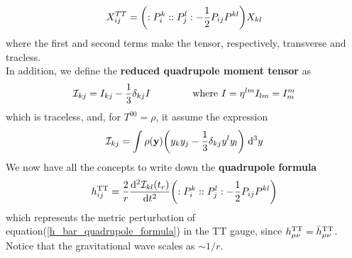 \begin{equation}
\label{TT_projection}
X^{TT} _{ij} = \qty(:P_{i}^{k}::P_{j}^{l}: - \dfrac{1}{2} P_{ij} P^{kl}) X_{kl}
\end{equation}
where the first and second terms make the tensor, respectively, transverse and tracless.\\
In addition, we define the \textbf{reduced quadrupole moment tensor} as
\begin{equation}
\label{reduced_quadrupole_moment_tensor}
\mathcal{I}_{kj} = I_{kj} - \dfrac{1}{3} \delta_{kj} I \hspace{1.5cm} \text{where } I=\eta^{ l m} I_{l m} = I^{m} _{m}
\end{equation}
which is traceless, and, for $T^{00} = \rho$, it assume the expression
\[
\mathcal{I} _{kj} = \int \rho(\vb{y}) \qty(y_{k} y_{j} - \dfrac{1}{3}\delta_{kj} y^{l} y_{l} ) \; \dd[3] y
\]
We now have all the concepts to write down 
the \textbf{quadrupole formula}
\begin{equation}
\label{h_TT_quadrupole_formula}
h^{\text{TT}}_{ij} = \dfrac{2}{r} \dv[2]{\mathcal{I}_{kl}(t_r)}{t} \qty(:P_{i}^{k}::P_{j}^{l}: - \dfrac{1}{2} P_{ij} P^{kl})
\end{equation}
which represents the metric perturbation of equation(\ref{h_bar_quadrupole_formula}) in the TT gauge, since $h^{\text{TT}}_{\mu \nu} = \bar{h} ^{\text{TT}}_{\mu \nu}$.
Notice that the gravitational wave scales as $\sim 1/r$.
\\


